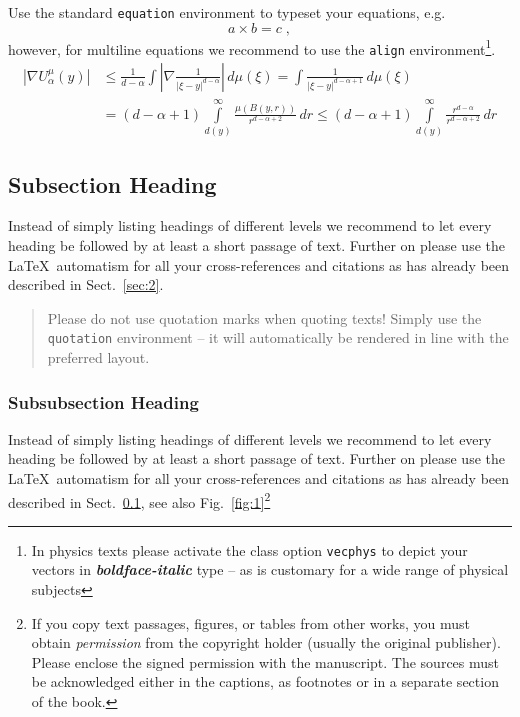 Use the standard \verb|equation| environment to typeset your equations, e.g.
%
\begin{equation}
a \times b = c\;,
\end{equation}
%
however, for multiline equations we recommend to use the \verb|align| environment\footnote{In physics texts please activate the class option \texttt{vecphys} to depict your vectors in \textbf{\itshape boldface-italic} type -- as is customary for a wide range of physical subjects}.
\begin{align}
\left|\nabla U_{\alpha}^{\mu}(y)\right| &\le\frac1{d-\alpha}\int
\left|\nabla\frac1{|\xi-y|^{d-\alpha}}\right|\,d\mu(\xi) =
\int \frac1{|\xi-y|^{d-\alpha+1}} \,d\mu(\xi)  \\
&=(d-\alpha+1) \int\limits_{d(y)}^\infty
\frac{\mu(B(y,r))}{r^{d-\alpha+2}}\,dr \le (d-\alpha+1)
\int\limits_{d(y)}^\infty \frac{r^{d-\alpha}}{r^{d-\alpha+2}}\,dr
\label{eq:01}
\end{align}

\subsection{Subsection Heading}
\label{subsec:2}
Instead of simply listing headings of different levels we recommend to let every heading be followed by at least a short passage of text.  Further on please use the \LaTeX\ automatism for all your cross-references and citations as has already been described in Sect.~\ref{sec:2}.

\begin{quotation}
Please do not use quotation marks when quoting texts! Simply use the \verb|quotation| environment -- it will automatically be rendered in line with the preferred layout.
\end{quotation}


\subsubsection{Subsubsection Heading}
Instead of simply listing headings of different levels we recommend to let every heading be followed by at least a short passage of text.  Further on please use the \LaTeX\ automatism for all your cross-references and citations as has already been described in Sect.~\ref{subsec:2}, see also Fig.~\ref{fig:1}\footnote{If you copy text passages, figures, or tables from other works, you must obtain \textit{permission} from the copyright holder (usually the original publisher). Please enclose the signed permission with the manuscript. The sources must be acknowledged either in the captions, as footnotes or in a separate section of the book.}

